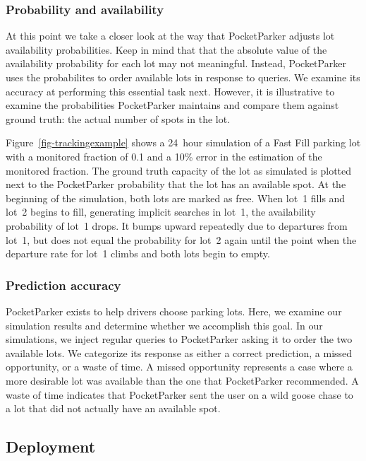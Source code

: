 \subsubsection{Probability and availability}

At this point we take a closer look at the way that PocketParker adjusts lot
availability probabilities. Keep in mind that that the absolute value of the
availability probability for each lot may not meaningful. Instead,
PocketParker uses the probabilites to order available lots in response to
queries. We examine its accuracy at performing this essential task next.
However, it is illustrative to examine the probabilities PocketParker
maintains and compare them against ground truth: the actual number of spots
in the lot.

Figure~\ref{fig-trackingexample} shows a 24~hour simulation of a Fast Fill
parking lot with a monitored fraction of 0.1 and a 10\% error in the
estimation of the monitored fraction. The ground truth capacity of the lot as
simulated is plotted next to the PocketParker probability that the lot has an
available spot. At the beginning of the simulation, both lots are marked as
free. When lot~1 fills and lot~2 begins to fill, generating implicit searches
in lot~1, the availability probability of lot~1 drops. It bumps upward
repeatedly due to departures from lot~1, but does not equal the probability
for lot~2 again until the point when the departure rate for lot~1 climbs and
both lots begin to empty.

\subsubsection{Prediction accuracy}



PocketParker exists to help drivers choose parking lots. Here, we examine our
simulation results and determine whether we accomplish this goal. In our
simulations, we inject regular queries to PocketParker asking it to order the
two available lots. We categorize its response as either a correct
prediction, a missed opportunity, or a waste of time. A missed opportunity
represents a case where a more desirable lot was available than the one that
PocketParker recommended. A waste of time indicates that PocketParker sent
the user on a wild goose chase to a lot that did not actually have an
available spot.

\subsection{Deployment}

